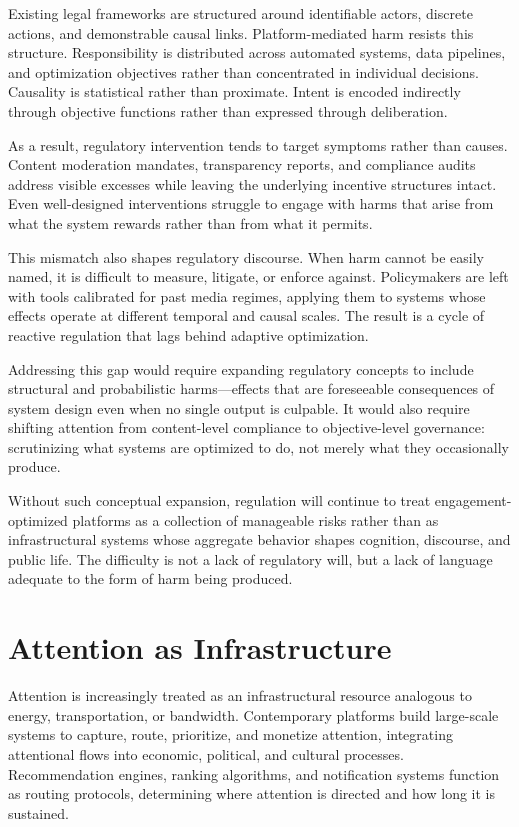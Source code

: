 \documentclass[12pt]{article}
\begin{document}
Existing legal frameworks are structured around identifiable actors, discrete actions, and demonstrable causal links. Platform-mediated harm resists this structure. Responsibility is distributed across automated systems, data pipelines, and optimization objectives rather than concentrated in individual decisions. Causality is statistical rather than proximate. Intent is encoded indirectly through objective functions rather than expressed through deliberation.

As a result, regulatory intervention tends to target symptoms rather than causes. Content moderation mandates, transparency reports, and compliance audits address visible excesses while leaving the underlying incentive structures intact. Even well-designed interventions struggle to engage with harms that arise from what the system rewards rather than from what it permits.

This mismatch also shapes regulatory discourse. When harm cannot be easily named, it is difficult to measure, litigate, or enforce against. Policymakers are left with tools calibrated for past media regimes, applying them to systems whose effects operate at different temporal and causal scales. The result is a cycle of reactive regulation that lags behind adaptive optimization.

Addressing this gap would require expanding regulatory concepts to include structural and probabilistic harms—effects that are foreseeable consequences of system design even when no single output is culpable. It would also require shifting attention from content-level compliance to objective-level governance: scrutinizing what systems are optimized to do, not merely what they occasionally produce.

Without such conceptual expansion, regulation will continue to treat engagement-optimized platforms as a collection of manageable risks rather than as infrastructural systems whose aggregate behavior shapes cognition, discourse, and public life. The difficulty is not a lack of regulatory will, but a lack of language adequate to the form of harm being produced.

\section{Attention as Infrastructure}

Attention is increasingly treated as an infrastructural resource analogous to energy, transportation, or bandwidth. Contemporary platforms build large-scale systems to capture, route, prioritize, and monetize attention, integrating attentional flows into economic, political, and cultural processes. Recommendation engines, ranking algorithms, and notification systems function as routing protocols, determining where attention is directed and how long it is sustained.
\end{document}
